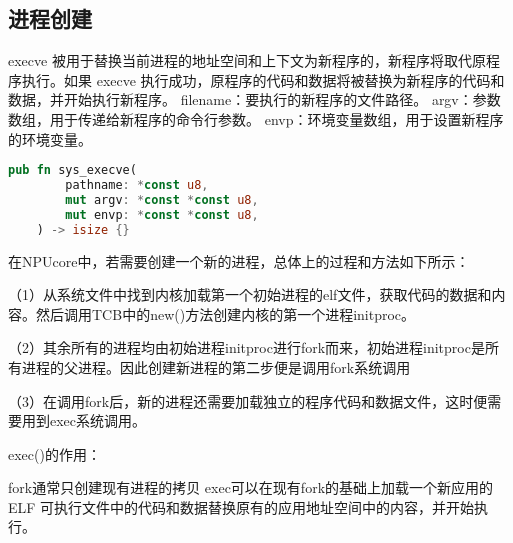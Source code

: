 \subsection{进程创建}
execve 被用于替换当前进程的地址空间和上下文为新程序的，新程序将取代原程序执行。如果 execve 执行成功，原程序的代码和数据将被替换为新程序的代码和数据，并开始执行新程序。
filename：要执行的新程序的文件路径。
argv：参数数组，用于传递给新程序的命令行参数。
envp：环境变量数组，用于设置新程序的环境变量。
\begin{lstlisting}[language={Rust},
    caption={参数说明}]
    pub fn sys_execve(
        pathname: *const u8,
        mut argv: *const *const u8,
        mut envp: *const *const u8,
    ) -> isize {}
\end{lstlisting}
在NPUcore中，若需要创建一个新的进程，总体上的过程和方法如下所示：

（1）从系统文件中找到内核加载第一个初始进程的elf文件，获取代码的数据和内容。然后调用TCB中的new()方法创建内核的第一个进程initproc。

（2）其余所有的进程均由初始进程initproc进行fork而来，初始进程initproc是所有进程的父进程。因此创建新进程的第二步便是调用fork系统调用

（3）在调用fork后，新的进程还需要加载独立的程序代码和数据文件，这时便需要用到exec系统调用。

exec()的作用：

fork通常只创建现有进程的拷贝
exec可以在现有fork的基础上加载一个新应用的 ELF 可执行文件中的代码和数据替换原有的应用地址空间中的内容，并开始执行。


